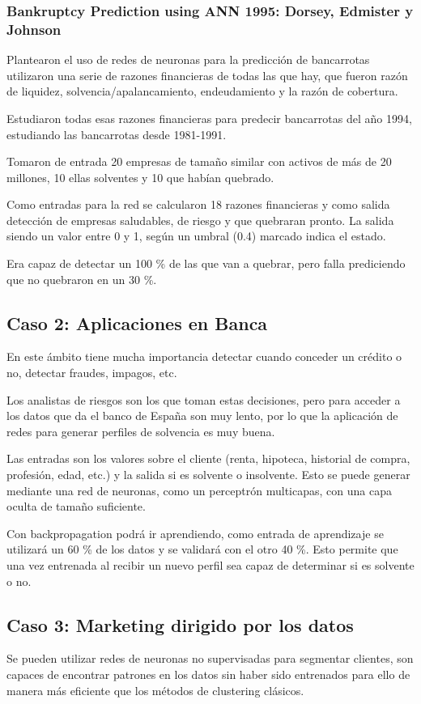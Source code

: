 \documentclass[12pt, twoside, openright]{report} %
\begin{document}
\subsubsection{Bankruptcy Prediction using ANN 1995: Dorsey, Edmister y Johnson}
Plantearon el uso de redes de neuronas para la predicción de bancarrotas utilizaron una serie de razones financieras de todas las que hay, que fueron razón de liquidez, solvencia/apalancamiento, endeudamiento y la razón de cobertura.

Estudiaron todas esas razones financieras para predecir bancarrotas del año 1994, estudiando las bancarrotas desde 1981-1991.

Tomaron de entrada 20 empresas de tamaño similar con activos de más de 20 millones, 10 ellas solventes y 10 que habían quebrado. 

Como entradas para la red se calcularon 18 razones financieras y como salida detección de empresas saludables, de riesgo y que quebraran pronto. La salida siendo un valor entre 0 y 1, según un umbral (0.4) marcado indica el estado.

Era capaz de detectar un 100 \% de las que van a quebrar, pero falla prediciendo que no quebraron en un 30 \%.

\subsection{Caso 2: Aplicaciones en Banca}
En este ámbito tiene mucha importancia detectar cuando conceder un crédito o no, detectar fraudes, impagos, etc.

Los analistas de riesgos son los que toman estas decisiones, pero para acceder a los datos que da el banco de España son muy lento, por lo que la aplicación de redes para generar perfiles de solvencia es muy buena.

Las entradas son los valores sobre el cliente (renta, hipoteca, historial de compra, profesión, edad, etc.) y la salida si es solvente o insolvente. Esto se puede generar mediante una red de neuronas, como un perceptrón multicapas, con una capa oculta de tamaño suficiente. 

Con backpropagation podrá ir aprendiendo, como entrada de aprendizaje se utilizará un 60 \% de los datos y se validará con el otro 40 \%. Esto permite que una vez entrenada al recibir un nuevo perfil sea capaz de determinar si es solvente o no.

\subsection{Caso 3: Marketing dirigido por los datos}
Se pueden utilizar redes de neuronas no supervisadas para segmentar clientes, son capaces de encontrar patrones en los datos sin haber sido entrenados para ello de manera más eficiente que los métodos de clustering clásicos.
\end{document}
